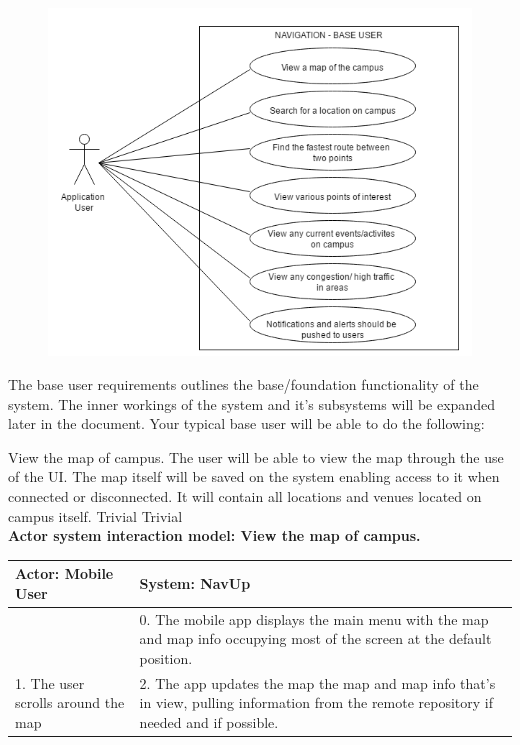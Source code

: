 \begin{figure} 
  \includegraphics[width=\textwidth]{diagrams/Specific_Requirements/base_user_use_case.png}
\end{figure}
The base user requirements outlines the base/foundation functionality of the system. The inner workings of the system and it's subsystems will be expanded later in the document. Your typical base user will be able to do the following:
\\
\bigskip

\FuncReq
{View the map of campus.}
{The user will be able to view the map through the use of the UI. The map itself will be saved on the system enabling access to it when connected or disconnected. It will contain all locations and venues located on campus itself.}
{Trivial}
{Trivial}
    \\
    \textbf{Actor system interaction model: View the map of campus. }\\
    \begin{tabular}{ | p{6cm} | p{6cm} |}
    \hline
    Actor: Mobile User & System: NavUp \\ \hline
    & 0. The mobile app displays the main menu with the map and map info occupying most of the screen at the default position.\\ \hline
    1. The user scrolls around the map & 2. The app updates the map the map and map info that's in view, pulling information from the remote repository if needed and if possible.\\ \hline
    
    \end{tabular}
\\
\bigskip


